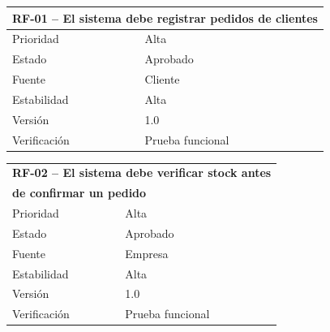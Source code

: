 \documentclass[11pt,a4paper]{article}
\begin{document}
\begin{table}[h!]
\centering\small
\begin{tabular}{ll}
\toprule
\multicolumn{2}{l}{\textbf{RF-01 -- El sistema debe registrar pedidos de clientes}} \\
\midrule
Prioridad & Alta \\
Estado & Aprobado \\
Fuente & Cliente \\
Estabilidad & Alta \\
Versión & 1.0 \\
Verificación & Prueba funcional \\
\bottomrule
\end{tabular}
\hfill
\begin{tabular}{ll}
\toprule
\multicolumn{2}{l}{\textbf{RF-02 -- El sistema debe verificar stock antes}} \\
\multicolumn{2}{l}{\textbf{de confirmar un pedido}} \\
\midrule
Prioridad & Alta \\
Estado & Aprobado \\
Fuente & Empresa \\
Estabilidad & Alta \\
Versión & 1.0 \\
Verificación & Prueba funcional \\
\bottomrule
\end{tabular}

\vspace{0.6cm}


\end{table}
\end{document}
